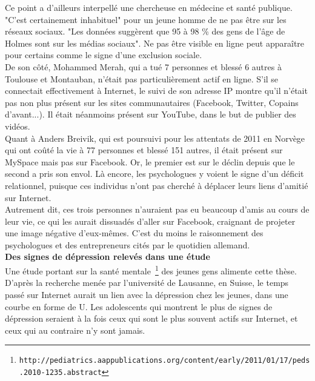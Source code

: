 \documentclass[11pt,twoside,a4paper]{article}
\begin{document}
Ce point a d'ailleurs interpell{\'e} une chercheuse en m{\'e}decine et sant{\'e} publique. "C'est certainement inhabituel" pour un jeune homme de ne pas {\^e}tre sur les r{\'e}seaux sociaux. "Les donn{\'e}es sugg{\`e}rent que 95 {\`a} 98 \% des gens de l'{\^a}ge de Holmes sont sur les m{\'e}dias sociaux". Ne pas {\^e}tre visible en ligne peut appara{\^i}tre pour certains comme le signe d'une exclusion sociale.~\\

De son c{\^o}t{\'e}, Mohammed Merah, qui a tu{\'e} 7 personnes et bless{\'e} 6 autres {\`a} Toulouse et Montauban, n'{\'e}tait pas particuli{\`e}rement actif en ligne. S'il se connectait effectivement {\`a} Internet, le suivi de son adresse IP montre qu'il n'{\'e}tait pas non plus pr{\'e}sent sur les sites communautaires (Facebook, Twitter, Copains d'avant...). Il {\'e}tait n{\'e}anmoins pr{\'e}sent sur YouTube, dans le but de publier des vid{\'e}os.~\\

Quant {\`a} Anders Breivik, qui est poursuivi pour les attentats de 2011 en Norv{\`e}ge qui ont co{\^u}t{\'e} la vie {\`a} 77 personnes et bless{\'e} 151 autres, il {\'e}tait pr{\'e}sent sur MySpace mais pas sur Facebook. Or, le premier est sur le d{\'e}clin depuis que le second a pris son envol. L{\`a} encore, les psychologues y voient le signe d'un d{\'e}ficit relationnel, puisque ces individus n'ont pas cherch{\'e} {\`a} d{\'e}placer leurs liens d'amiti{\'e} sur Internet.~\\

Autrement dit, ces trois personnes n'auraient pas eu beaucoup d'amis au cours de leur vie, ce qui les aurait dissuad{\'e}s d'aller sur Facebook, craignant de projeter une image n{\'e}gative d'eux-m{\^e}mes. C'est du moins le raisonnement des psychologues et des entrepreneurs cit{\'e}s par le quotidien allemand.~\\


\textbf{Des signes de d{\'e}pression relev{\'e}s dans une {\'e}tude}~\\

Une {\'e}tude portant sur la sant{\'e} mentale~\footnote{\texttt{http://pediatrics.aappublications.org/content/early/2011/01/17/peds.2010-1235.abstract}} des jeunes gens alimente cette th{\`e}se. D'apr{\`e}s la recherche men{\'e}e par l'universit{\'e} de Lausanne, en Suisse, le temps pass{\'e} sur Internet aurait un lien avec la d{\'e}pression chez les jeunes, dans une courbe en forme de U. Les adolescents qui montrent le plus de signes de d{\'e}pression seraient {\`a} la fois ceux qui sont le plus souvent actifs sur Internet, et ceux qui au contraire n'y sont jamais.~\\
\end{document}
